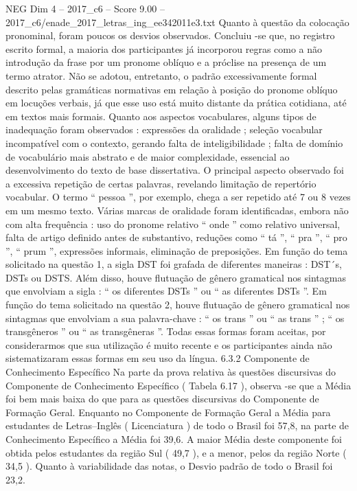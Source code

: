 \begin{textsample}{NEG Dim 4 – 2017\_c6 – Score 9.00 – 2017\_c6/enade\_2017\_letras\_ing\_ee342011e3.txt}
Quanto à questão da colocação pronominal, foram poucos os desvios observados.
Concluiu -se que, no registro escrito formal, a maioria dos participantes já incorporou regras como a não introdução da frase por um pronome oblíquo e a próclise na presença de um termo atrator.
Não se adotou, entretanto, o padrão excessivamente formal descrito pelas gramáticas normativas em relação à posição do pronome oblíquo em locuções verbais, já que esse uso está muito distante da prática cotidiana, até em textos mais formais.
Quanto aos aspectos vocabulares, alguns tipos de inadequação foram observados : expressões da oralidade ; seleção vocabular incompatível com o contexto, gerando falta de inteligibilidade ; falta de domínio de vocabulário mais abstrato e de maior complexidade, essencial ao desenvolvimento do texto de base dissertativa.
O principal aspecto observado foi a excessiva repetição de certas palavras, revelando limitação de repertório vocabular.
O termo “ pessoa ”, por exemplo, chega a ser repetido até 7 ou 8 vezes em um mesmo texto.
Várias marcas de oralidade foram identificadas, embora não com alta frequência : uso do pronome relativo “ onde ” como relativo universal, falta de artigo definido antes de substantivo, reduções como “ tá ”, “ pra ”, “ pro ”, “ prum ”, expressões informais, eliminação de preposições.
Em função do tema solicitado na questão 1, a sigla DST foi grafada de diferentes maneiras : DST´s, DSTs ou DSTS.
Além disso, houve flutuação de gênero gramatical nos sintagmas que envolviam a sigla : “ os diferentes DSTs ” ou “ as diferentes DSTs ”.
Em função do tema solicitado na questão 2, houve flutuação de gênero gramatical nos sintagmas que envolviam a sua palavra-chave : “ os trans ” ou “ as trans ” ; “ os transgêneros ” ou “ as transgêneras ”.
Todas essas formas foram aceitas, por considerarmos que sua utilização é muito recente e os participantes ainda não sistematizaram essas formas em seu uso da língua. 6.3.2 Componente de Conhecimento Específico Na parte da prova relativa às questões discursivas do Componente de Conhecimento Específico ( Tabela 6.17 ), observa -se que a Média foi bem mais baixa do que para as questões discursivas do Componente de Formação Geral.
Enquanto no Componente de Formação Geral a Média para estudantes de Letras–Inglês ( Licenciatura ) de todo o Brasil foi 57,8, na parte de Conhecimento Específico a Média foi 39,6.
A maior Média deste componente foi obtida pelos estudantes da região Sul ( 49,7 ), e a menor, pelos da região Norte ( 34,5 ).
Quanto à variabilidade das notas, o Desvio padrão de todo o Brasil foi 23,2.

\end{textsample}

